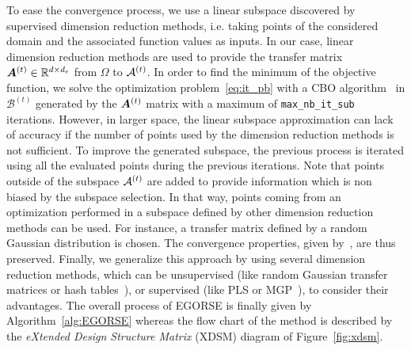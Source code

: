 To ease the convergence process, we use a linear subspace discovered by supervised dimension reduction methods, i.e. taking points of the considered domain and the associated function values as inputs.
In our case, linear dimension reduction methods are used to provide the transfer matrix $\bm{A}^{(t)} \in \mathbb{R}^{d \times d_e}$ from $\Omega$ to ${\mathcal{A}}^{(t)}$.
 In order to find the minimum of the objective function, we solve the optimization problem~\eqref{eq:it_pb} with a CBO algorithm~\cite{frazierTutorialBayesianOptimization2018,ShahriariTakingHumanOut2016,priemOptimisationBayesienneSous2020} in $\mathcal{B}^{(t)}$ generated by the $\bm{A}^{(t)}$ matrix with a maximum of \texttt{max\_nb\_it\_sub} iterations.
However, in larger space, the linear subspace approximation can lack of accuracy if the number of points used by the dimension reduction methods is not sufficient.
To improve the generated subspace, the previous process is iterated using all the evaluated points during the previous iterations.
Note that points outside of the subspace ${\mathcal{A}}^{(t)}$ are added to provide information which is non biased by the subspace selection.
In that way, points coming from an optimization performed in a subspace defined by other dimension reduction methods can be used.
For instance, a transfer matrix defined by a random Gaussian distribution is chosen. 
The convergence properties, given by~\citet{binoisChoiceLowdimensionalDomain2020}, are thus preserved. 
Finally, we 
generalize this approach by using several dimension reduction methods, which can be unsupervised (like random Gaussian transfer matrices or hash tables~\cite{binoisChoiceLowdimensionalDomain2020,nayebiFrameworkBayesianOptimization2019}), or supervised (like PLS or MGP~\cite{hellandStructurePartialLeast1988,GarnettActiveLearningLinear2014}), to consider their advantages. 
The overall process of EGORSE is finally given by Algorithm~\ref{alg:EGORSE} whereas the flow chart of the method is described by the \textit{eXtended Design Structure Matrix} (XDSM) \cite{lambeExtensionsDesignStructure2012} diagram of Figure~\ref{fig:xdsm}.
